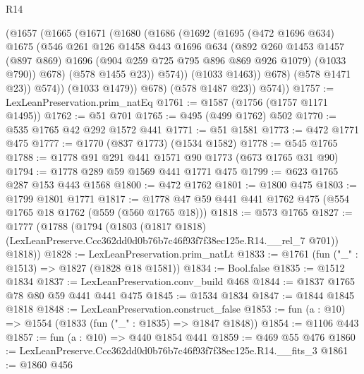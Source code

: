 \begin{lexlean}{R14}
\begin{coremodule}
                (@1657
                  (@1665
                    (@1671
                      (@1680
                        (@1686
                          (@1692
                            (@1695
                              (@472 @1696 @634)
                              @1675
                              (@546
                                @261
                                @126
                                @1458
                                @443
                                @1696
                                @634
                                (@892
                                  @260
                                  @1453
                                  @1457
                                  (@897 @869)
                                  @1696
                                  (@904 @259 @725 @795 @896 @869 @926 @1079)
                                  (@1033 @790))
                                @678)
                              (@578 @1455 @23))
                            @574))
                        (@1033 @1463))
                      @678)
                    (@578 @1471 @23))
                  @574))
              (@1033 @1479))
            @678)
          (@578 @1487 @23))
        @574))
@1757 := LexLeanPreservation.prim_natEq
@1761 := @1587 (@1756 (@1757 @1171 @1495))
@1762 := @51 @701
@1765 := @495 (@499 @1762) @502
@1770 := @535 @1765 @42 @292 @1572 @441
@1771 := @51 @1581
@1773 := @472 @1771 @475
@1777 := @1770 (@837 @1773) (@1534 @1582)
@1778 := @545 @1765
@1788 := @1778 @91 @291 @441 @1571 @90 @1773 (@673 @1765 @31 @90)
@1794 := @1778 @289 @59 @1569 @441 @1771 @475
@1799 := @623 @1765 @287 @153 @443 @1568
@1800 := @472 @1762
@1801 := @1800 @475
@1803 := @1799 @1801 @1771
@1817 := @1778 @47 @59 @441 @441 @1762 @475 (@554 @1765 @18 @1762 (@559 (@560 @1765 @18)))
@1818 := @573 @1765
@1827 := @1777
    (@1788
      (@1794
        (@1803 (@1817 @1818) (LexLeanPreserve.Ccc362dd0d0b76b7c46f93f7f38ec125e.R14.__rel_7 @701))
        @1818))
@1828 := LexLeanPreservation.prim_natLt
@1833 := @1761 (fun ("_" : @1513) => @1827 (@1828 @18 @1581))
@1834 := Bool.false
@1835 := @1512 @1834
@1837 := LexLeanPreservation.conv_build @468
@1844 := @1837 @1765 @78 @80 @59 @441 @441 @475
@1845 := @1534 @1834
@1847 := @1844 @1845 @1818
@1848 := LexLeanPreservation.construct_false
@1853 := fun (a : @10) => @1554 (@1833 (fun ("_" : @1835) => @1847 @1848))
@1854 := @1106 @443
@1857 := fun (a : @10) => @440 @1854 @441
@1859 := @469 @55 @476
@1860 := LexLeanPreserve.Ccc362dd0d0b76b7c46f93f7f38ec125e.R14.__fits_3
@1861 := @1860 @456

\end{coremodule}
\end{lexlean}
